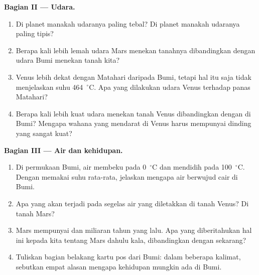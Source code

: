 \begin{problem}
\medskip
\noindent\textbf{Bagian II --- Udara.}
\begin{enumerate}[resume]
  \item Di planet manakah udaranya paling tebal? Di planet manakah udaranya
        paling tipis?
  \item Berapa kali lebih lemah udara Mars menekan tanahnya dibandingkan
        dengan udara Bumi menekan tanah kita?
  \item Venus lebih dekat dengan Matahari daripada Bumi, tetapi hal itu saja
        tidak menjelaskan suhu 464~$^\circ$C. Apa yang dilakukan udara Venus
        terhadap panas Matahari?
  \item Berapa kali lebih kuat udara menekan tanah Venus dibandingkan dengan
        di Bumi? Mengapa wahana yang mendarat di Venus harus mempunyai dinding yang sangat kuat?
\end{enumerate}

\medskip
\noindent\textbf{Bagian III --- Air dan kehidupan.}
\begin{enumerate}[resume]
  \item Di permukaan Bumi, air membeku pada 0~$^\circ$C dan mendidih pada
        100~$^\circ$C. Dengan memakai suhu rata-rata, jelaskan mengapa air
        berwujud cair di Bumi.
  \item Apa yang akan terjadi pada segelas air yang diletakkan di tanah
        Venus? Di tanah Mars?
  \item Mars mempunyai  dan  miliaran tahun yang lalu. Apa yang
        diberitahukan hal ini kepada kita tentang  Mars dahulu kala,
        dibandingkan dengan sekarang?
  \item Tuliskan bagian belakang kartu pos dari Bumi: dalam beberapa kalimat,
        sebutkan empat alasan mengapa kehidupan mungkin ada di Bumi.
\end{enumerate}
\end{problem}
